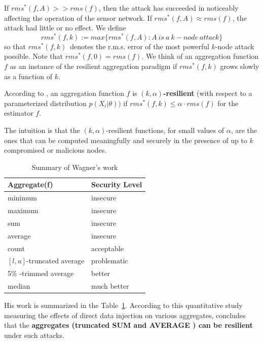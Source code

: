 	If $rms^*(f,A) >> rms(f)$, then the attack has succeeded in noticeably affecting the operation of the sensor network.
	If $rms^*(f,A) \approx rms(f)$, the attack had little or no effect.
	We define
	\begin{equation}
		rms^*(f,k) := max\{rms^*(f,A): A\ is\ a\ k-node\ attack\}
	\end{equation}
	so that $rms^*(f,k)$\ denotes the r.m.s. error of the most powerful
	$k$-node attack possible. 
	Note that $rms^* (f, 0) = rms(f)$.
	We think of an aggregation function $f$ as an instance of the resilient aggregation paradigm if $rms^* (f, k)$ grows slowly as a function of $k$.
	\begin{definition}
		According to \cite{wagner2004resilient}, an aggregation function $f$ is \textbf{$(k, \alpha)$-resilient} (with respect to a parameterized distribution $p(X_{i} | \theta))$ if $rms^*(f, k) \le \alpha \cdot rms(f)$ for the estimator $f$.
		\label{def:resilient}
	\end{definition}
	The intuition is that the $(k, \alpha)$-resilient functions, for small values of $\alpha$, are the ones that can be computed meaningfully and securely in the presence of up to $k$ compromised or malicious nodes.
	\begin{table}[!htb]	
		\begin{center}
			\begin{tabular}{ |l| l| }
				\hline
			    Aggregate(f) & Security Level \\
			    \hline
			    minimum & insecure \\
			    maximum & insecure \\
			    sum & insecure \\
				average & insecure \\
				count & acceptable \\
				$[l,u]$-truncated average & problematic \\
				5\% -trimmed average & better \\
				median & much better \\
			    \hline
			\end{tabular}
		\end{center}
		 \caption{Summary of Wagner's work}
		 \label{table:wagner}
	\end{table}
	His work is summarized in the Table~\ref{table:wagner}.
	According to this quantitative study measuring the effects of direct data injection on various aggregates, concludes that the \textbf{aggregates (truncated SUM and AVERAGE ) can be resilient} under such attacks.
